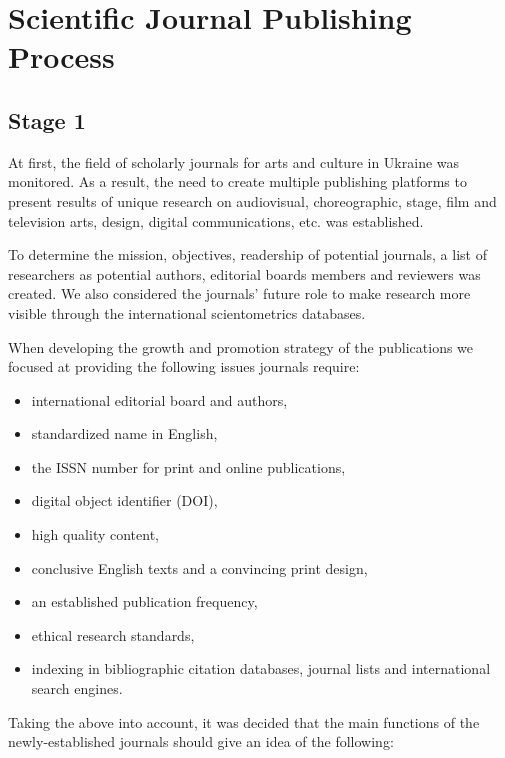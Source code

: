 \documentclass[a4paper,
fontsize=11pt,
oneside,
numbers=noperiodatend,
parskip=half-,
bibliography=totoc,
final
]{scrartcl}
\begin{document}
\hypertarget{scientific-journal-publishing-process}{%
\section{Scientific Journal Publishing
Process}\label{scientific-journal-publishing-process}}

\hypertarget{stage-1}{%
\subsection{Stage 1}\label{stage-1}}

At first, the field of scholarly journals for arts and culture in
Ukraine was monitored. As a result, the need to create multiple
publishing platforms to present results of unique research on
audiovisual, choreographic, stage, film and television arts, design,
digital communications, etc. was established.

To determine the mission, objectives, readership of potential journals,
a list of researchers as potential authors, editorial boards members and
reviewers was created. We also considered the journals' future role to
make research more visible through the international scientometrics
databases.

When developing the growth and promotion strategy of the publications we
focused at providing the following issues journals require:

\begin{itemize}
\item
  international editorial board and authors,
\item
  standardized name in English,
\item
  the ISSN number for print and online publications,
\item
  digital object identifier (DOI),
\item
  high quality content,
\item
  conclusive English texts and a convincing print design,
\item
  an established publication frequency,
\item
  ethical research standards,
\item
  indexing in bibliographic citation databases, journal lists and
  international search engines.
\end{itemize}

Taking the above into account, it was decided that the main functions of
the newly-established journals should give an idea of the following:
\end{document}
